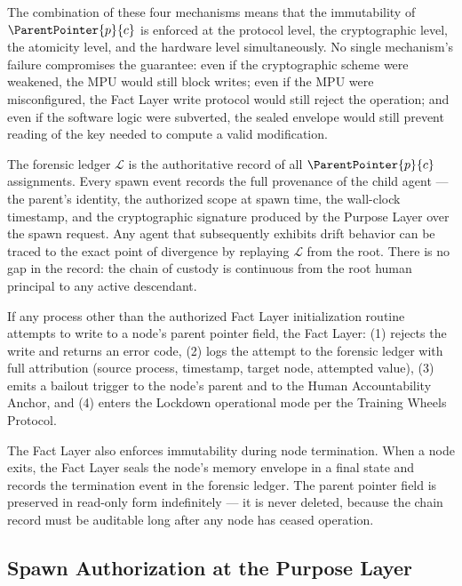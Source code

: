 The combination of these four mechanisms means that the immutability of $\ParentPointer{p}{c}$ is enforced at the protocol level, the cryptographic level, the atomicity level, and the hardware level simultaneously. No single mechanism's failure compromises the guarantee: even if the cryptographic scheme were weakened, the MPU would still block writes; even if the MPU were misconfigured, the Fact Layer write protocol would still reject the operation; and even if the software logic were subverted, the sealed envelope would still prevent reading of the key needed to compute a valid modification.

The forensic ledger $\mathcal{L}$ is the authoritative record of all $\ParentPointer{p}{c}$ assignments. Every spawn event records the full provenance of the child agent --- the parent's identity, the authorized scope at spawn time, the wall-clock timestamp, and the cryptographic signature produced by the Purpose Layer over the spawn request. Any agent that subsequently exhibits drift behavior can be traced to the exact point of divergence by replaying $\mathcal{L}$ from the root. There is no gap in the record: the chain of custody is continuous from the root human principal to any active descendant.

\begin{dfn}
\label{dfn:rs-bailout-parent-pointer}
If any process other than the authorized Fact Layer initialization routine attempts to write to a node's parent pointer field, the Fact Layer: (1) rejects the write and returns an error code, (2) logs the attempt to the forensic ledger with full attribution (source process, timestamp, target node, attempted value), (3) emits a bailout trigger to the node's parent and to the Human Accountability Anchor, and (4) enters the Lockdown operational mode per the Training Wheels Protocol.
\end{dfn}

The Fact Layer also enforces immutability during node termination. When a node exits, the Fact Layer seals the node's memory envelope in a final state and records the termination event in the forensic ledger. The parent pointer field is preserved in read-only form indefinitely --- it is never deleted, because the chain record must be auditable long after any node has ceased operation.

\subsection{Spawn Authorization at the Purpose Layer}
\label{sec:rs-spawn-authorization}

